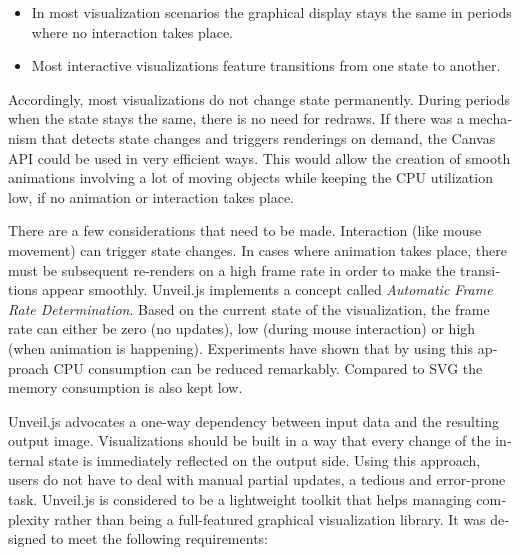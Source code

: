 \begin{english}
\begin{itemize}
\item
  In most visualization scenarios the graphical display stays the same in periods where no interaction takes place.
\item
  Most interactive visualizations feature transitions from one state to another.
\end{itemize}

\SuperPar Accordingly, most visualizations do not change state permanently. During periods when the state stays the same, there is no need for redraws. If there was a mechanism that detects state changes and triggers renderings on demand, the Canvas API could be used in very efficient ways. This would allow the creation of smooth animations involving a lot of moving objects while keeping the CPU utilization low, if no animation or interaction takes place.

There are a few considerations that need to be made. Interaction (like mouse movement) can trigger state changes. In cases where animation takes place, there must be subsequent re-renders on a high frame rate in order to make the transitions appear smoothly. Unveil.js implements a concept called \emph{Automatic Frame Rate Determination}. Based on the current state of the visualization, the frame rate can either be zero (no updates), low (during mouse interaction) or high (when animation is happening). Experiments have shown that by using this approach CPU consumption can be reduced remarkably. Compared to SVG the memory consumption is also kept low.

Unveil.js advocates a one-way dependency between input data and the resulting output image. Visualizations should be built in a way that every change of the internal state is immediately reflected on the output side. Using this approach, users do not have to deal with manual partial updates, a tedious and error-prone task. Unveil.js is considered to be a lightweight toolkit that helps managing complexity rather than being a full-featured graphical visualization library. It was designed to meet the following requirements:


\end{english}
